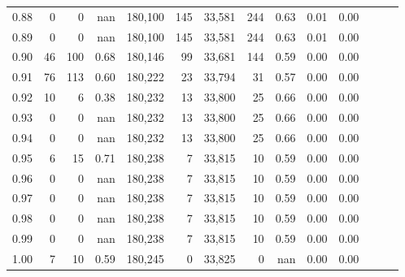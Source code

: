 \begin{tabular}{rrrrrrrrrrrrrr}
0.88 &       0 &      0 &   nan &  180,100 &      145 &  33,581 &     244 &  0.63 &  0.01 &      0.00 \\
0.89 &       0 &      0 &   nan &  180,100 &      145 &  33,581 &     244 &  0.63 &  0.01 &      0.00 \\
0.90 &      46 &    100 &  0.68 &  180,146 &       99 &  33,681 &     144 &  0.59 &  0.00 &      0.00 \\
0.91 &      76 &    113 &  0.60 &  180,222 &       23 &  33,794 &      31 &  0.57 &  0.00 &      0.00 \\
0.92 &      10 &      6 &  0.38 &  180,232 &       13 &  33,800 &      25 &  0.66 &  0.00 &      0.00 \\
0.93 &       0 &      0 &   nan &  180,232 &       13 &  33,800 &      25 &  0.66 &  0.00 &      0.00 \\
0.94 &       0 &      0 &   nan &  180,232 &       13 &  33,800 &      25 &  0.66 &  0.00 &      0.00 \\
0.95 &       6 &     15 &  0.71 &  180,238 &        7 &  33,815 &      10 &  0.59 &  0.00 &      0.00 \\
0.96 &       0 &      0 &   nan &  180,238 &        7 &  33,815 &      10 &  0.59 &  0.00 &      0.00 \\
0.97 &       0 &      0 &   nan &  180,238 &        7 &  33,815 &      10 &  0.59 &  0.00 &      0.00 \\
0.98 &       0 &      0 &   nan &  180,238 &        7 &  33,815 &      10 &  0.59 &  0.00 &      0.00 \\
0.99 &       0 &      0 &   nan &  180,238 &        7 &  33,815 &      10 &  0.59 &  0.00 &      0.00 \\
1.00 &       7 &     10 &  0.59 &  180,245 &        0 &  33,825 &       0 &   nan &  0.00 &      0.00 \\
\bottomrule
\end{tabular}
